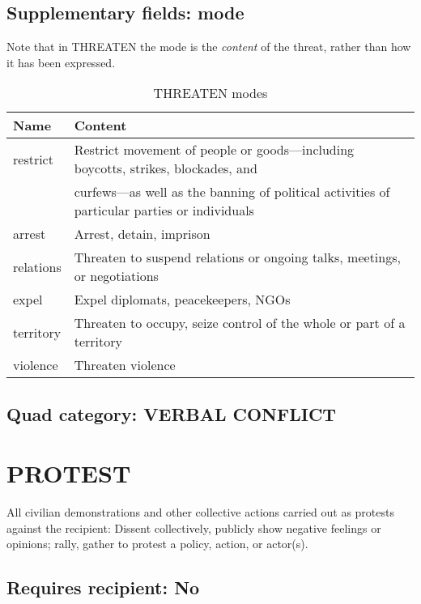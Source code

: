 \documentclass[11pt]{report}
\newcommand{\plcat}[1]{\textsf{#1}}
\newcommand{\ti}[1]{\textit{#1}}
\begin{document}
\subsection{Supplementary fields: mode}

Note that in \plcat{THREATEN} the mode is the \ti{content} of the threat, rather than how it has been expressed.

\begin{table}[htp]
\caption{THREATEN modes}
\begin{center}
\begin{tabular}{|l|l|}
\hline
Name & Content \\
\hline
restrict & Restrict movement of people or goods---including boycotts, strikes, blockades, and  \\
& curfews---as well as the banning of political activities of particular parties or individuals \\
arrest & Arrest, detain, imprison \\
relations & Threaten to suspend relations or ongoing talks, meetings, or negotiations\\
expel & Expel diplomats, peacekeepers, NGOs \\
territory & Threaten to occupy, seize control of the whole or part of a territory \\
violence & Threaten violence \\
\hline
\end{tabular}
\end{center}
\label{tab:threatmode}
\end{table}%

\subsection{Quad category: VERBAL CONFLICT}

\newpage

\section{PROTEST}

All civilian demonstrations and other collective actions carried out as protests against the recipient: Dissent collectively, publicly show negative feelings or opinions; rally, gather to protest a policy, action, or actor(s).

\subsection{Requires recipient: No}
\end{document}
